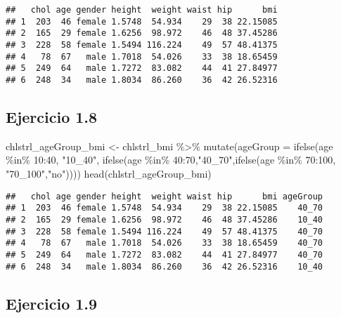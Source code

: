 \documentclass[
]{article}
\newenvironment{Shaded}{\begin{snugshade}}{\end{snugshade}}
\newcommand{\AttributeTok}[1]{\textcolor[rgb]{0.77,0.63,0.00}{#1}}
\newcommand{\DecValTok}[1]{\textcolor[rgb]{0.00,0.00,0.81}{#1}}
\newcommand{\FunctionTok}[1]{\textcolor[rgb]{0.00,0.00,0.00}{#1}}
\newcommand{\NormalTok}[1]{#1}
\newcommand{\OtherTok}[1]{\textcolor[rgb]{0.56,0.35,0.01}{#1}}
\newcommand{\SpecialCharTok}[1]{\textcolor[rgb]{0.00,0.00,0.00}{#1}}
\newcommand{\StringTok}[1]{\textcolor[rgb]{0.31,0.60,0.02}{#1}}
\begin{document}
\begin{verbatim}
##   chol age gender height  weight waist hip      bmi
## 1  203  46 female 1.5748  54.934    29  38 22.15085
## 2  165  29 female 1.6256  98.972    46  48 37.45286
## 3  228  58 female 1.5494 116.224    49  57 48.41375
## 4   78  67   male 1.7018  54.026    33  38 18.65459
## 5  249  64   male 1.7272  83.082    44  41 27.84977
## 6  248  34   male 1.8034  86.260    36  42 26.52316
\end{verbatim}

\hypertarget{ejercicio-1.8}{%
\subsection{Ejercicio 1.8}\label{ejercicio-1.8}}

\begin{Shaded}
\begin{Highlighting}[]
\NormalTok{chlstrl\_ageGroup\_bmi }\OtherTok{\textless{}{-}}\NormalTok{ chlstrl\_bmi }\SpecialCharTok{\%\textgreater{}\%} 
  \FunctionTok{mutate}\NormalTok{(}\AttributeTok{ageGroup =} \FunctionTok{ifelse}\NormalTok{(age }\SpecialCharTok{\%in\%} \DecValTok{10}\SpecialCharTok{:}\DecValTok{40}\NormalTok{, }\StringTok{"10\_40"}\NormalTok{, }\FunctionTok{ifelse}\NormalTok{(age }\SpecialCharTok{\%in\%} \DecValTok{40}\SpecialCharTok{:}\DecValTok{70}\NormalTok{,}\StringTok{"40\_70"}\NormalTok{,}\FunctionTok{ifelse}\NormalTok{(age }\SpecialCharTok{\%in\%} \DecValTok{70}\SpecialCharTok{:}\DecValTok{100}\NormalTok{, }\StringTok{"70\_100"}\NormalTok{,}\StringTok{"no"}\NormalTok{))))}
\FunctionTok{head}\NormalTok{(chlstrl\_ageGroup\_bmi)}
\end{Highlighting}
\end{Shaded}

\begin{verbatim}
##   chol age gender height  weight waist hip      bmi ageGroup
## 1  203  46 female 1.5748  54.934    29  38 22.15085    40_70
## 2  165  29 female 1.6256  98.972    46  48 37.45286    10_40
## 3  228  58 female 1.5494 116.224    49  57 48.41375    40_70
## 4   78  67   male 1.7018  54.026    33  38 18.65459    40_70
## 5  249  64   male 1.7272  83.082    44  41 27.84977    40_70
## 6  248  34   male 1.8034  86.260    36  42 26.52316    10_40
\end{verbatim}

\hypertarget{ejercicio-1.9}{%
\subsection{Ejercicio 1.9}\label{ejercicio-1.9}}
\end{document}
